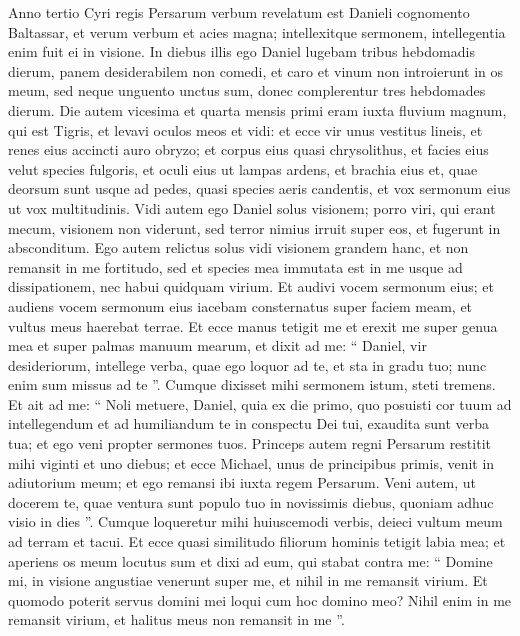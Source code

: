\begin{biblechapter}
\begin{biblechapter}
\begin{biblechapter}
\begin{biblechapter}
\begin{biblechapter}
\begin{biblechapter}
\begin{biblechapter}
\begin{biblechapter}
\begin{biblechapter}
\begin{biblechapter}
\verse Anno tertio Cyri regis Persarum verbum revelatum est Danieli cognomento Baltassar, et verum verbum et acies magna; intellexitque sermonem, intellegentia enim fuit ei in visione. 
\verse In diebus illis ego Daniel lugebam tribus hebdomadis dierum, 
\verse panem desiderabilem non comedi, et caro et vinum non introierunt in os meum, sed neque unguento unctus sum, donec complerentur tres hebdomades dierum.
 \verse Die autem vicesima et quarta mensis primi eram iuxta fluvium magnum, qui est Tigris, 
\verse et levavi oculos meos et vidi: et ecce vir unus vestitus lineis, et renes eius accincti auro obryzo; 
\verse et corpus eius quasi chrysolithus, et facies eius velut species fulgoris, et oculi eius ut lampas ardens, et brachia eius et, quae deorsum sunt usque ad pedes, quasi species aeris candentis, et vox sermonum eius ut vox multitudinis. 
\verse Vidi autem ego Daniel solus visionem; porro viri, qui erant mecum, visionem non viderunt, sed terror nimius irruit super eos, et fugerunt in absconditum. 
\verse Ego autem relictus solus vidi visionem grandem hanc, et non remansit in me fortitudo, sed et species mea immutata est in me usque ad dissipationem, nec habui quidquam virium. 
\verse Et audivi vocem sermonum eius; et audiens vocem sermonum eius iacebam consternatus super faciem meam, et vultus meus haerebat terrae.
 \verse Et ecce manus tetigit me et erexit me super genua mea et super palmas manuum mearum, 
\verse et dixit ad me: “ Daniel, vir desideriorum, intellege verba, quae ego loquor ad te, et sta in gradu tuo; nunc enim sum missus ad te ”. Cumque dixisset mihi sermonem istum, steti tremens. 
\verse Et ait ad me: “ Noli metuere, Daniel, quia ex die primo, quo posuisti cor tuum ad intellegendum et ad humiliandum te in conspectu Dei tui, exaudita sunt verba tua; et ego veni propter sermones tuos. 
\verse Princeps autem regni Persarum restitit mihi viginti et uno diebus; et ecce Michael, unus de principibus primis, venit in adiutorium meum; et ego remansi ibi iuxta regem Persarum. 
\verse Veni autem, ut docerem te, quae ventura sunt populo tuo in novissimis diebus, quoniam adhuc visio in dies ”. 
\verse Cumque loqueretur mihi huiuscemodi verbis, deieci vultum meum ad terram et tacui. 
\verse Et ecce quasi similitudo filiorum hominis tetigit labia mea; et aperiens os meum locutus sum et dixi ad eum, qui stabat contra me: “ Domine mi, in visione angustiae venerunt super me, et nihil in me remansit virium. 
\verse Et quomodo poterit servus domini mei loqui cum hoc domino meo? Nihil enim in me remansit virium, et halitus meus non remansit in me ”. 

\end{biblechapter}
\end{biblechapter}
\end{biblechapter}
\end{biblechapter}
\end{biblechapter}
\end{biblechapter}
\end{biblechapter}
\end{biblechapter}
\end{biblechapter}
\end{biblechapter}

